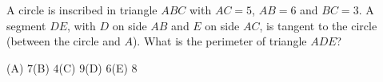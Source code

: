 A circle is inscribed in triangle $ABC$ with $AC=5$, $AB=6$ and $BC=3$. A segment $DE$, with $D$ on side $AB$ and $E$ on side $AC$, is tangent to the circle (between the circle and $A$). What is the perimeter of triangle $ADE$?

(A) $7$\quad (B) $4$\quad (C) $9$\quad (D) $6$\quad (E) $8$
